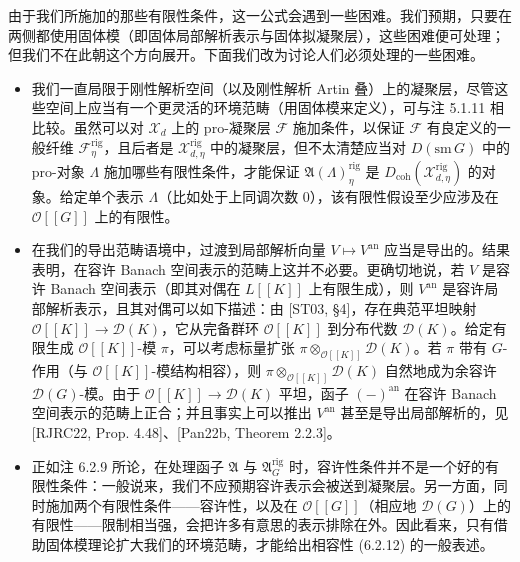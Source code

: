 由于我们所施加的那些有限性条件，这一公式会遇到一些困难。我们预期，只要在两侧都使用固体模（即固体局部解析表示与固体拟凝聚层），这些困难便可处理；但我们不在此朝这个方向展开。下面我们改为讨论人们必须处理的一些困难。

\begin{itemize}
\item 我们一直局限于刚性解析空间（以及刚性解析 Artin 叠）上的凝聚层，尽管这些空间上应当有一个更灵活的环境范畴（用固体模来定义），可与注 5.1.11 相比较。虽然可以对 $\mathcal X_d$ 上的 pro-凝聚层 $\mathcal F$ 施加条件，以保证 $\mathcal F$ 有良定义的一般纤维 $\mathcal F^{\mathrm{rig}}_\eta$，且后者是 $\mathcal X^{\mathrm{rig}}_{d,\eta}$ 中的凝聚层，但不太清楚应当对 $D(\mathrm{sm}\,G)$ 中的 pro-对象 $\Lambda$ 施加哪些有限性条件，才能保证 $\mathfrak A(\Lambda)^{\mathrm{rig}}_\eta$ 是 $D_{\mathrm{coh}}(\mathcal X^{\mathrm{rig}}_{d,\eta})$ 的对象。给定单个表示 $\Lambda$（比如处于上同调次数 0），该有限性假设至少应涉及在 $\mathcal O[[G]]$ 上的有限性。

\item 在我们的导出范畴语境中，过渡到局部解析向量 $V\mapsto V^{\mathrm{an}}$ 应当是导出的。结果表明，在容许 Banach 空间表示的范畴上这并不必要。更确切地说，若 $V$ 是容许 Banach 空间表示（即其对偶在 $L[[K]]$ 上有限生成），则 $V^{\mathrm{an}}$ 是容许局部解析表示，且其对偶可以如下描述：由 [ST03, §4]，存在典范平坦映射 $\mathcal O[[K]]\to\mathcal D(K)$，它从完备群环 $\mathcal O[[K]]$ 到分布代数 $\mathcal D(K)$。给定有限生成 $\mathcal O[[K]]$-模 $\pi$，可以考虑标量扩张 $\pi\otimes_{\mathcal O[[K]]}\mathcal D(K)$。若 $\pi$ 带有 $G$-作用（与 $\mathcal O[[K]]$-模结构相容），则 $\pi\otimes_{\mathcal O[[K]]}\mathcal D(K)$ 自然地成为余容许 $\mathcal D(G)$-模。由于 $\mathcal O[[K]]\to\mathcal D(K)$ 平坦，函子 $(-)^{\mathrm{an}}$ 在容许 Banach 空间表示的范畴上正合；并且事实上可以推出 $V^{\mathrm{an}}$ 甚至是导出局部解析的，见 [RJRC22, Prop. 4.48]、[Pan22b, Theorem 2.2.3]。
\item 正如注 6.2.9 所论，在处理函子 $\mathfrak A$ 与 $\mathfrak A^{\mathrm{rig}}_G$ 时，容许性条件并不是一个好的有限性条件：一般说来，我们不应预期容许表示会被送到凝聚层。另一方面，同时施加两个有限性条件——容许性，以及在 $\mathcal O[[G]]$（相应地 $\mathcal D(G)$）上的有限性——限制相当强，会把许多有意思的表示排除在外。因此看来，只有借助固体模理论扩大我们的环境范畴，才能给出相容性 (6.2.12) 的一般表述。
\end{itemize}

